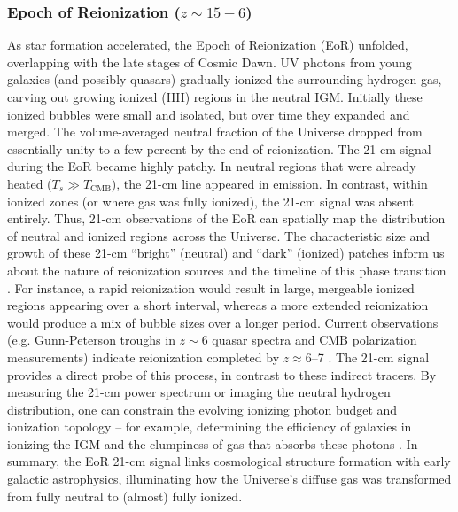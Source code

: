 \documentclass[floats,floatfix,showpacs,amssymb,prd,superscriptaddress,nofootinbib]{revtex4-2} %
\begin{document}
\subsubsection{Epoch of Reionization ($z \sim 15-6$)}
As star formation accelerated, the Epoch of Reionization (EoR) unfolded, overlapping with the late stages of Cosmic Dawn. UV photons from young galaxies (and possibly quasars) gradually ionized the surrounding hydrogen gas, carving out growing ionized (HII) regions in the neutral IGM. Initially these ionized bubbles were small and isolated, but over time they expanded and merged. The volume-averaged neutral fraction of the Universe dropped from essentially unity to a few percent by the end of reionization. The 21-cm signal during the EoR became highly patchy. In neutral regions that were already heated ($T_s \gg T_{\text{CMB}}$), the 21-cm line appeared in emission. In contrast, within ionized zones (or where gas was fully ionized), the 21-cm signal was absent entirely. Thus, 21-cm observations of the EoR can spatially map the distribution of neutral and ionized regions across the Universe. The characteristic size and growth of these 21-cm “bright” (neutral) and “dark” (ionized) patches inform us about the nature of reionization sources and the timeline of this phase transition \citep{McQuinn_2007, Friedrich_2011}. For instance, a rapid reionization would result in large, mergeable ionized regions appearing over a short interval, whereas a more extended reionization would produce a mix of bubble sizes over a longer period. Current observations (e.g. Gunn-Peterson troughs in $z\sim6$ quasar spectra and CMB polarization measurements) indicate reionization completed by $z\approx6$–7 \citep{Fan_2006, Planck2015results}. The 21-cm signal provides a direct probe of this process, in contrast to these indirect tracers. By measuring the 21-cm power spectrum or imaging the neutral hydrogen distribution, one can constrain the evolving ionizing photon budget and ionization topology – for example, determining the efficiency of galaxies in ionizing the IGM and the clumpiness of gas that absorbs these photons \citep{Robertson_2010, Greig_Mesinger_2017}.
In summary, the EoR 21-cm signal links cosmological structure formation with early galactic astrophysics, illuminating how the Universe’s diffuse gas was transformed from fully neutral to (almost) fully ionized.
\end{document}
